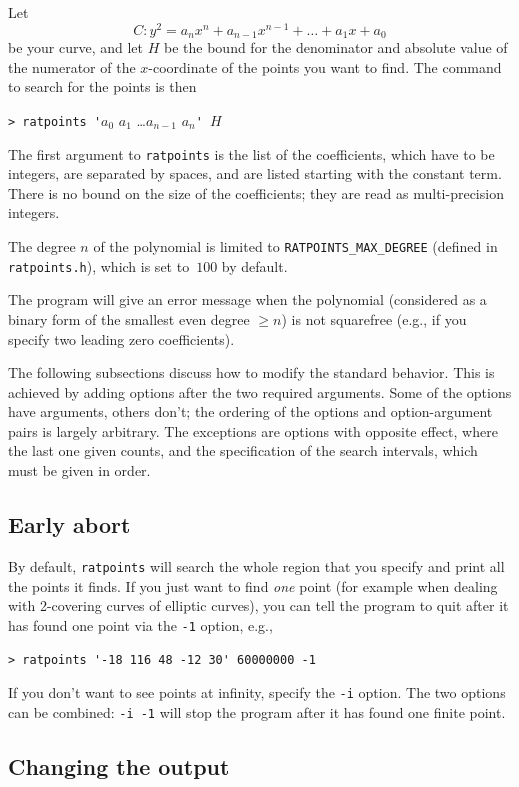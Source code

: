 \documentclass[12pt,a4paper,oneside]{amsart}
\begin{document}
Let
\[ C : y^2 = a_n x^n + a_{n-1} x^{n-1} + \dots + a_1 x + a_0 \]
be your
curve, and let $H$ be the bound for the denominator and absolute value
of the numerator of the $x$-coordinate of the points you want to find.
The command to search for the points is then

\verb+> ratpoints '+$a_0$ $a_1$ \dots $a_{n-1}$ $a_n$\verb+' +$H$

The first argument to \texttt{ratpoints} is the list of the coefficients,
which have to be integers, are separated by spaces, and are listed
starting with the constant term. There is no bound on the size of the
coefficients; they are read as multi-precision integers.

The degree $n$ of the polynomial is limited to \texttt{RATPOINTS\_MAX\_DEGREE}
(defined in \texttt{ratpoints.h}), which is set to~$100$ by default.

The program will give an error message when the polynomial (considered
as a binary form of the smallest even degree $\ge n$) is not squarefree
(e.g., if you specify two leading zero coefficients).

The following subsections discuss how to modify the standard behavior.
This is achieved by adding options after the two required arguments.
Some of the options have arguments, others don't; the ordering of
the options and option-argument pairs is largely arbitrary.
The exceptions are options with opposite effect, where the last one given counts,
and the specification of the search intervals, which must be given in order.

\subsection{Early abort}

By default, \texttt{ratpoints} will search the whole region that you specify
and print all the points it finds. If you just want to find {\em one}
point (for example when dealing with 2-covering curves of elliptic curves),
you can tell the program to quit after it has found one point via the
\verb+-1+ option, e.g.,

\verb+> ratpoints '-18 116 48 -12 30' 60000000 -1+

If you don't want to see points at infinity, specify the \verb+-i+ option.
The two options can be combined: \verb+-i -1+ will stop the program after
it has found one finite point.

\subsection{Changing the output}
\end{document}
